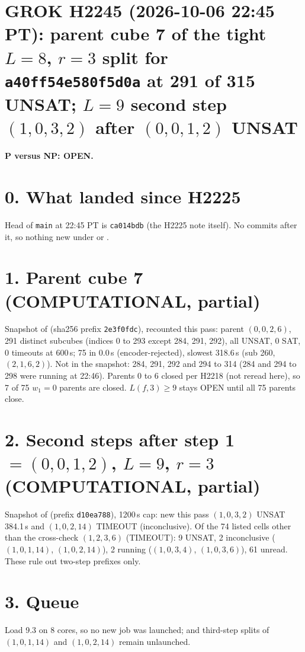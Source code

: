 \documentclass[11pt]{article}
\begin{document}
\sloppy
\section*{GROK H2245 (2026-10-06 22:45 PT): parent cube 7 of the tight $L=8$, $r=3$ split for \texttt{a40ff54e580f5d0a} at 291 of 315 UNSAT; $L=9$ second step $(1,0,3,2)$ after $(0,0,1,2)$ UNSAT}
\textbf{P versus NP: OPEN.}

\section*{0. What landed since H2225}
Head of \texttt{main} at 22:45 PT is \texttt{ca014bdb} (the H2225 note itself). No commits after it, so nothing new under  or .

\section*{1. Parent cube 7 (COMPUTATIONAL, partial)}
Snapshot  of  (sha256 prefix \texttt{2e3f0fdc}), recounted this pass: parent $(0,0,2,6)$, 291 distinct subcubes (indices 0 to 293 except 284, 291, 292), all UNSAT, 0 SAT, 0 timeouts at 600\,s; 75 in 0.0\,s (encoder-rejected), slowest 318.6\,s (sub 260, $(2,1,6,2)$). Not in the snapshot: 284, 291, 292 and 294 to 314 (284 and 294 to 298 were running at 22:46). Parents 0 to 6 closed per H2218 (not reread here), so 7 of 75 $w_1=0$ parents are closed. $L(f,3)\ge 9$ stays OPEN until all 75 parents close.

\section*{2. Second steps after step 1 $=(0,0,1,2)$, $L=9$, $r=3$ (COMPUTATIONAL, partial)}
Snapshot  of  (prefix \texttt{d10ea788}), 1200\,s cap: new this pass $(1,0,3,2)$ UNSAT 384.1\,s and $(1,0,2,14)$ TIMEOUT (inconclusive). Of the 74 listed cells other than the cross-check $(1,2,3,6)$ (TIMEOUT): 9 UNSAT, 2 inconclusive ($(1,0,1,14)$, $(1,0,2,14)$), 2 running ($(1,0,3,4)$, $(1,0,3,6)$), 61 unread. These rule out two-step prefixes only.

\section*{3. Queue}
Load 9.3 on 8 cores, so no new job was launched;  and third-step splits of $(1,0,1,14)$ and $(1,0,2,14)$ remain unlaunched.
\end{document}
